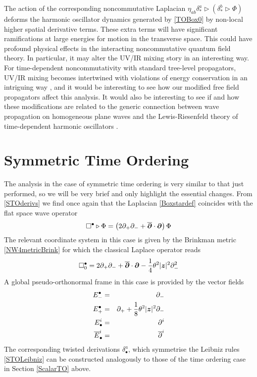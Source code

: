 The action of the corresponding noncommutative Laplacian $\eta_{ab}
\delta_*^a\triangleright(\delta_*^b\triangleright\Phi)$ deforms the harmonic
oscillator dynamics generated by \eqref{TOBox0} by non-local higher spatial
derivative terms. These extra terms will have significant ramifications at large
energies for motion in the transverse space. This could have profound physical
effects in the interacting noncommutative quantum field theory. In particular,
it may alter the UV/IR mixing story \cite{MVRS1} in an interesting way. For
time-dependent noncommutativity with standard tree-level propagators, UV/IR
mixing becomes intertwined with violations of energy conservation in an
intriguing way \cite{BG1,RS1}, and it would be interesting to see how our
modified free field propagators affect this analysis. It would also be
interesting to see if and how these modifications are related to the generic
connection between wave propagation on homogeneous plane waves and the
Lewis-Riesenfeld theory of time-dependent harmonic oscillators \cite{BOL1}.

\section{Symmetric Time Ordering}
\label{ScalarSTO}
The analysis in the case of symmetric time ordering is very similar to that just
performed, so we will be very brief and only highlight the essential changes.
From \eqref{STOderivs} we find once again that the Laplacian \eqref{Boxstardef}
coincides with the flat space wave operator
\begin{equation}
  \label{STOBoxeq}
  \Box^\bullet\triangleright\Phi=\left(2 \partial_+ \partial_-+
    \overline{{{\boldsymbol {\partial} }}}\cdot{{\boldsymbol {\partial} }}\right)\Phi  
\end{equation}
The relevant coordinate system in this case is given by the Brinkman metric
\eqref{NW4metricBrink} for which the classical Laplace operator reads
\begin{equation}
  \label{STOBox0}
  \Box_0^\bullet=2 \partial_+ \partial_-+\overline{{{\boldsymbol {\partial} }}}\cdot
  {{\boldsymbol {\partial} }}- \frac14  \theta^2 |{{\boldsymbol {z} }}|^2 \partial_-^2  
\end{equation}
A global pseudo-orthonormal frame in this case is provided by the vector fields
\begin{eqnarray}
  \label{STOorthoframe}
  E_-^\bullet&=&\partial_-   \nonumber\\ E_+^\bullet&=&\partial_++
  \frac18  \theta^2 |{{\boldsymbol {z} }}|^2 \partial_-\\ E^{i}_\bullet&=&\partial^i   \nonumber\\
  \overline{E}_{\bullet}^{ i}&=&\overline{\partial}^{i} \nonumber
\end{eqnarray}
The corresponding twisted derivations $\delta^a_\bullet$, which symmetrise the
Leibniz rules \eqref{STOLeibniz} can be constructed analogously to those of the
time ordering case in Section \ref{ScalarTO} above.

